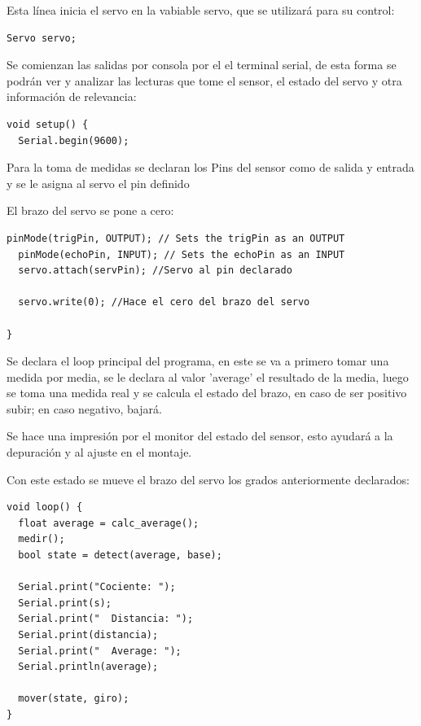 \documentclass[12pt,twocolumn]{article}
\begin{document}
Esta línea inicia el servo en la vabiable
servo, que se utilizará para su control:

\begin{lstlisting}[texcl=true]
Servo servo;
\end{lstlisting}

Se comienzan las salidas por consola 
  por el el terminal serial, de esta forma
  se podrán ver y analizar las lecturas que 
  tome el sensor, el estado del servo y otra 
  información de relevancia:
  
\begin{lstlisting}[texcl=true]
void setup() {
  Serial.begin(9600);
\end{lstlisting}

Para la toma de medidas se declaran los
  Pins del sensor como de salida y entrada
  y se le asigna al servo el pin definido
  
  El brazo del servo se pone a cero:
  
\begin{lstlisting}[texcl=true]
  pinMode(trigPin, OUTPUT); // Sets the trigPin as an OUTPUT
  pinMode(echoPin, INPUT); // Sets the echoPin as an INPUT
  servo.attach(servPin); //Servo al pin declarado

  servo.write(0); //Hace el cero del brazo del servo
  
}
\end{lstlisting}

Se declara el loop principal
del programa, en este se va a 
primero tomar una medida por media, 
se le declara al valor 'average' el
resultado de la media, luego se toma
una medida real y se calcula el estado 
del brazo, en caso de ser positivo 
subir; en caso negativo, bajará.

Se hace una impresión por el monitor
del estado del sensor, esto ayudará
a la depuración y al ajuste en el
montaje.

Con este estado se mueve el brazo 
del servo los grados anteriormente
declarados:

\begin{lstlisting}[texcl=true]
void loop() {
  float average = calc_average();
  medir();
  bool state = detect(average, base);
  
  Serial.print("Cociente: ");
  Serial.print(s);
  Serial.print("  Distancia: ");
  Serial.print(distancia);
  Serial.print("  Average: ");
  Serial.println(average);
  
  mover(state, giro);
}
\end{lstlisting}
\end{document}
